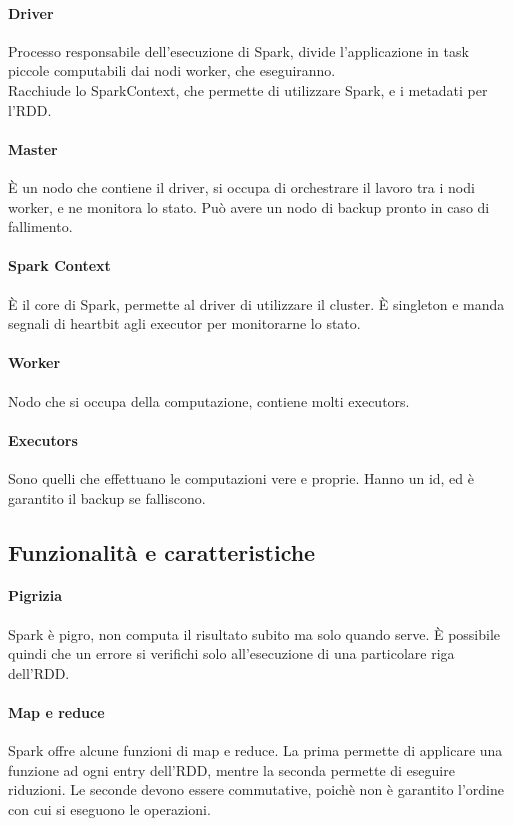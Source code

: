 \documentclass[a4paper]{article}
\begin{document}
\paragraph{Driver}
Processo responsabile dell'esecuzione di Spark, divide l'applicazione in task piccole
computabili dai nodi worker, che eseguiranno.\\
Racchiude lo SparkContext, che permette di utilizzare Spark, e i metadati per l'RDD.

\paragraph{Master}
È un nodo che contiene il driver, si occupa di orchestrare il lavoro tra i nodi worker, 
e ne monitora lo stato. Può avere un nodo di backup pronto in caso di fallimento.

\paragraph{Spark Context}
È il core di Spark, permette al driver di utilizzare il cluster. È singleton e manda segnali 
di heartbit agli executor per monitorarne lo stato.

\paragraph{Worker}
Nodo che si occupa della computazione, contiene molti executors.

\paragraph{Executors}
Sono quelli che effettuano le computazioni vere e proprie. Hanno un id, ed è 
garantito il backup se falliscono.

\subsection{Funzionalità e caratteristiche}

\paragraph{Pigrizia}
Spark è pigro, non computa il risultato subito ma solo quando serve. 
È possibile quindi che un errore si verifichi solo all'esecuzione di una particolare 
riga dell'RDD. 

\paragraph{Map e reduce}
Spark offre alcune funzioni di map e reduce. La prima permette di applicare una funzione
ad ogni entry dell'RDD, mentre la seconda permette di eseguire riduzioni. Le seconde devono essere
commutative, poichè non è garantito l'ordine con cui si eseguono le operazioni.
\end{document}
